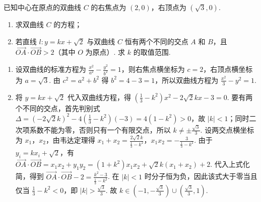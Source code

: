 \begin{problem}
已知中心在原点的双曲线 \(C\) 的右焦点为 \((2,0)\)，右顶点为 \((\sqrt{3},0)\).

\begin{enumerate}
\item 求双曲线 \(C\) 的方程；
\item 若直线 \(l: y = kx + \sqrt{2}\) 与双曲线 \(C\) 恒有两个不同的交点 \(A\) 和 \(B\)，且 \(\overrightarrow{OA} \cdot \overrightarrow{OB} > 2\)（其中 \(O\) 为原点）. 求 \(k\) 的取值范围.
\end{enumerate}

\begin{solution}
\begin{enumerate}
\item 设双曲线的标准方程为 \(\frac{x^2}{a^2}-\frac{y^2}{b^2}=1\)，则右焦点横坐标为 \(c=2\)，右顶点横坐标为 \(a=\sqrt3\). 由 \(c^2=a^2+b^2\) 得 \(b^2=4-3=1\)，所以双曲线方程为 \(\frac{x^2}{3}-y^2=1\).
\item 将 \(y=kx+\sqrt2\) 代入双曲线方程，得 \(\left(\frac13-k^2\right)x^2-2\sqrt2kx-3=0\). 要有两个不同的交点，首先判别式 \(\Delta=(-2\sqrt2k)^2-4\left(\frac13-k^2\right)(-3)=4(1-k^2)>0\)，故 \(|k|<1\)；同时二次项系数不能为零，否则只有一个有限交点，所以 \(k\ne\pm\frac{\sqrt3}{3}\). 设两交点横坐标为 \(x_1\)，\(x_2\)，由韦达定理得 \(x_1+x_2=\frac{2\sqrt2k}{\frac13-k^2}\)，\(x_1x_2=-\frac3{\frac13-k^2}\). 由于 \(y_i=kx_i+\sqrt2\)，有 \(\overrightarrow{OA}\cdot\overrightarrow{OB}=x_1x_2+y_1y_2=(1+k^2)x_1x_2+\sqrt2k(x_1+x_2)+2\). 代入上式化简，得到 \(\overrightarrow{OA}\cdot\overrightarrow{OB}-2=\frac{k^2-3}{\frac13-k^2}\). 在 \(|k|<1\) 时分子恒为负，因此该式大于零当且仅当 \(\frac13-k^2<0\)，即 \(|k|>\frac{\sqrt3}{3}\). 故 \(k\in\left(-1,-\frac{\sqrt3}{3}\right)\cup\left(\frac{\sqrt3}{3},1\right)\).
\end{enumerate}
\end{solution}
\end{problem}

